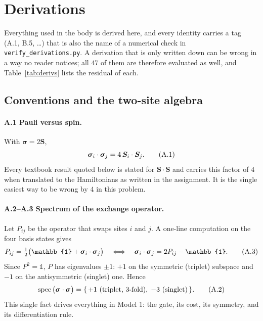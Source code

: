 \appendix
\clearpage
\section{Derivations}
\label{app:math}

Everything used in the body is derived here, and every identity carries a tag
(\textsf{A.1}, \textsf{B.5}, \dots) that is also the name of a numerical check
in \texttt{verify\_derivations.py}. A derivation that is only written down can
be wrong in a way no reader notices; all $47$ of them are therefore evaluated
as well, and Table~\ref{tab:derivs} lists the residual of each.

\subsection{Conventions and the two-site algebra}

\paragraph{\textsf{A.1} Pauli versus spin.}
With $\bm\sigma = 2\bm S$,
\begin{equation}
  \bm{\sigma}_i\cdot\bm{\sigma}_j = 4\,\bm S_i\cdot\bm S_j .
  \tag{A.1}
\end{equation}
Every textbook result quoted below is stated for $\bm S\cdot\bm S$ and carries
this factor of $4$ when translated to the Hamiltonians as written in the
assignment. It is the single easiest way to be wrong by $4$ in this problem.

\paragraph{\textsf{A.2}--\textsf{A.3} Spectrum of the exchange operator.}
Let $P_{ij}$ be the operator that swaps sites $i$ and $j$. A one-line
computation on the four basis states gives
\begin{equation}
  P_{ij} = \tfrac12\big(\mathbb{1} + \ssig_i\cdot\ssig_j\big)
  \quad\Longleftrightarrow\quad
  \ssig_i\cdot\ssig_j = 2P_{ij} - \mathbb{1}.
  \tag{A.3}
\end{equation}
Since $P^2=\mathbb{1}$, $P$ has eigenvalues $\pm1$: $+1$ on the symmetric
(triplet) subspace and $-1$ on the antisymmetric (singlet) one. Hence
\begin{equation}
  \operatorname{spec}\big(\bm{\sigma}\cdot\bm{\sigma}\big) = \{\,+1 \text{ (triplet, 3-fold)},\;
  -3 \text{ (singlet)}\,\}.
  \tag{A.2}
\end{equation}
This single fact drives everything in Model 1: the gate, its cost, its
symmetry, and its differentiation rule.

